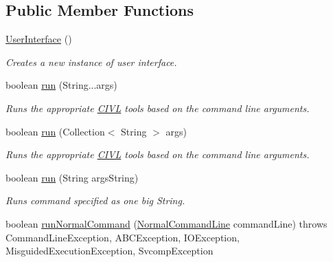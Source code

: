 \subsection*{Public Member Functions}
\begin{DoxyCompactItemize}
\item 
\hypertarget{classedu_1_1udel_1_1cis_1_1vsl_1_1civl_1_1run_1_1IF_1_1UserInterface_ac02b85377ce980e1165e69e4d49075e1}{}\hyperlink{classedu_1_1udel_1_1cis_1_1vsl_1_1civl_1_1run_1_1IF_1_1UserInterface_ac02b85377ce980e1165e69e4d49075e1}{User\+Interface} ()\label{classedu_1_1udel_1_1cis_1_1vsl_1_1civl_1_1run_1_1IF_1_1UserInterface_ac02b85377ce980e1165e69e4d49075e1}

\begin{DoxyCompactList}\small\item\em Creates a new instance of user interface. \end{DoxyCompactList}\item 
boolean \hyperlink{classedu_1_1udel_1_1cis_1_1vsl_1_1civl_1_1run_1_1IF_1_1UserInterface_ad0ae937732c9bf59239433d202895a77}{run} (String...\+args)
\begin{DoxyCompactList}\small\item\em Runs the appropriate \hyperlink{classedu_1_1udel_1_1cis_1_1vsl_1_1civl_1_1CIVL}{C\+I\+V\+L} tools based on the command line arguments. \end{DoxyCompactList}\item 
boolean \hyperlink{classedu_1_1udel_1_1cis_1_1vsl_1_1civl_1_1run_1_1IF_1_1UserInterface_aff1b611b8897e4a2db48247b7d6b01fc}{run} (Collection$<$ String $>$ args)
\begin{DoxyCompactList}\small\item\em Runs the appropriate \hyperlink{classedu_1_1udel_1_1cis_1_1vsl_1_1civl_1_1CIVL}{C\+I\+V\+L} tools based on the command line arguments. \end{DoxyCompactList}\item 
boolean \hyperlink{classedu_1_1udel_1_1cis_1_1vsl_1_1civl_1_1run_1_1IF_1_1UserInterface_a2b1fa8901c76e7d335e22e7383e6fd37}{run} (String args\+String)
\begin{DoxyCompactList}\small\item\em Runs command specified as one big String. \end{DoxyCompactList}\item 
boolean \hyperlink{classedu_1_1udel_1_1cis_1_1vsl_1_1civl_1_1run_1_1IF_1_1UserInterface_a1fbbd636ac86808fd12e3ddfb2ad1bc2}{run\+Normal\+Command} (\hyperlink{classedu_1_1udel_1_1cis_1_1vsl_1_1civl_1_1run_1_1common_1_1NormalCommandLine}{Normal\+Command\+Line} command\+Line)  throws Command\+Line\+Exception, A\+B\+C\+Exception, I\+O\+Exception, 			\+Misguided\+Execution\+Exception, Svcomp\+Exception 

\end{DoxyCompactItemize}
